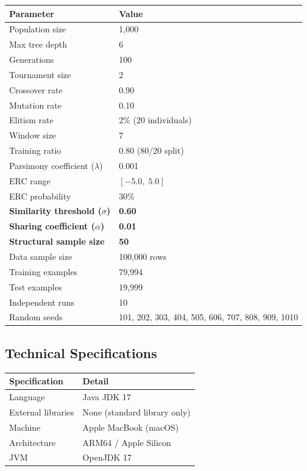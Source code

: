 \documentclass[12pt,a4paper]{article}
\begin{document}
\begin{center}
\begin{tabular}{@{}L{7cm}l@{}}
\toprule
\textbf{Parameter} & \textbf{Value} \\
\midrule
Population size & 1,000 \\
Max tree depth & 6 \\
Generations & 100 \\
Tournament size & 2 \\
Crossover rate & 0.90 \\
Mutation rate & 0.10 \\
Elitism rate & 2\% (20 individuals) \\
Window size & 7 \\
Training ratio & 0.80 (80/20 split) \\
Parsimony coefficient ($\lambda$) & 0.001 \\
ERC range & $[-5.0,\; 5.0]$ \\
ERC probability & 30\% \\
\midrule
\textbf{Similarity threshold ($\sigma$)} & \textbf{0.60} \\
\textbf{Sharing coefficient ($\alpha$)} & \textbf{0.01} \\
\textbf{Structural sample size} & \textbf{50} \\
\midrule
Data sample size & 100,000 rows \\
Training examples & 79,994 \\
Test examples & 19,999 \\
Independent runs & 10 \\
Random seeds & 101, 202, 303, 404, 505, 606, 707, 808, 909, 1010 \\
\bottomrule
\end{tabular}
\end{center}

\subsection{Technical Specifications}

\begin{center}
\begin{tabular}{@{}ll@{}}
\toprule
\textbf{Specification} & \textbf{Detail} \\
\midrule
Language & Java JDK 17 \\
External libraries & None (standard library only) \\
Machine & Apple MacBook (macOS) \\
Architecture & ARM64 / Apple Silicon \\
JVM & OpenJDK 17 \\
\bottomrule
\end{tabular}
\end{center}
\end{document}
